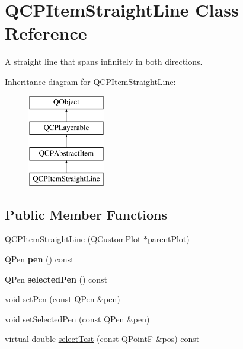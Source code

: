 \hypertarget{classQCPItemStraightLine}{\section{Q\-C\-P\-Item\-Straight\-Line Class Reference}
\label{classQCPItemStraightLine}
}


A straight line that spans infinitely in both directions.  


Inheritance diagram for Q\-C\-P\-Item\-Straight\-Line\-:\begin{figure}[H]
\begin{center}
\leavevmode
\includegraphics[height=4.000000cm]{classQCPItemStraightLine}
\end{center}
\end{figure}
\subsection*{Public Member Functions}
\begin{DoxyCompactItemize}
\item 
\hyperlink{classQCPItemStraightLine_a41fd2e1f006983449eca9830930c3b10}{Q\-C\-P\-Item\-Straight\-Line} (\hyperlink{classQCustomPlot}{Q\-Custom\-Plot} $\ast$parent\-Plot)
\item 
\hypertarget{classQCPItemStraightLine_ad858ab1a444391aab778f765453ea222}{Q\-Pen {\bfseries pen} () const }\label{classQCPItemStraightLine_ad858ab1a444391aab778f765453ea222}

\item 
\hypertarget{classQCPItemStraightLine_a9e33ae966a7e2ea1083b3b9aeabeaea5}{Q\-Pen {\bfseries selected\-Pen} () const }\label{classQCPItemStraightLine_a9e33ae966a7e2ea1083b3b9aeabeaea5}

\item 
void \hyperlink{classQCPItemStraightLine_a9f36c9c9e60d7d9ac084c80380ac8601}{set\-Pen} (const Q\-Pen \&pen)
\item 
void \hyperlink{classQCPItemStraightLine_a5c33559498d33543fa95cf0a36e851ff}{set\-Selected\-Pen} (const Q\-Pen \&pen)
\item 
virtual double \hyperlink{classQCPItemStraightLine_a8cd13e1da2d82613934401e2a9eec26d}{select\-Test} (const Q\-Point\-F \&pos) const 
\end{DoxyCompactItemize}
